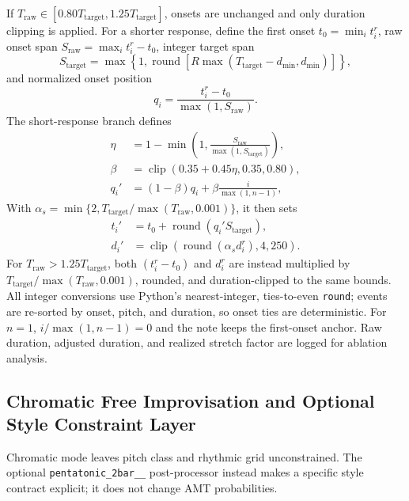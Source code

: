 \documentclass[11pt,a4paper]{article}
\begin{document}
If $T_{\mathrm{raw}}\in[0.80T_{\mathrm{target}},1.25T_{\mathrm{target}}]$, onsets are unchanged and only duration clipping is applied. For a shorter response, define the first onset $t_0=\min_i t_i^r$, raw onset span $S_{\mathrm{raw}}=\max_i t_i^r-t_0$, integer target span
\begin{equation}
S_{\mathrm{target}}=\max\left\{1,\operatorname{round}\left[R\max(T_{\mathrm{target}}-d_{\min},d_{\min})\right]\right\},
\end{equation}
and normalized onset position
\begin{equation}
q_i=\frac{t_i^r-t_0}{\max(1,S_{\mathrm{raw}})}.
\end{equation}
The short-response branch defines
\begin{align}
\eta &= 1-\min\left(1,\frac{S_{\mathrm{raw}}}{\max(1,S_{\mathrm{target}})}\right),\\
\beta &= \operatorname{clip}(0.35+0.45\eta,0.35,0.80),\\
q_i' &= (1-\beta)q_i+\beta\frac{i}{\max(1,n-1)},
\label{eq:actual-onset-time}
\end{align}
With $\alpha_s=\min\{2,T_{\mathrm{target}}/\max(T_{\mathrm{raw}},0.001)\}$, it then sets
\begin{align}
t_i' &= t_0+\operatorname{round}(q_i'S_{\mathrm{target}}),\\
d_i' &= \operatorname{clip}\left(\operatorname{round}(\alpha_s d_i^r),4,250\right).
\label{eq:actual-duration}
\end{align}
For $T_{\mathrm{raw}}>1.25T_{\mathrm{target}}$, both $(t_i^r-t_0)$ and $d_i^r$ are instead multiplied by $T_{\mathrm{target}}/\max(T_{\mathrm{raw}},0.001)$, rounded, and duration-clipped to the same bounds. All integer conversions use Python's nearest-integer, ties-to-even \texttt{round}; events are re-sorted by onset, pitch, and duration, so onset ties are deterministic. For $n=1$, $i/\max(1,n-1)=0$ and the note keeps the first-onset anchor. Raw duration, adjusted duration, and realized stretch factor are logged for ablation analysis.

\subsection{Chromatic Free Improvisation and Optional Style Constraint Layer}

Chromatic mode leaves pitch class and rhythmic grid unconstrained. The optional \texttt{pentatonic\_\allowbreak 2bar\_\_} post-processor instead makes a specific style contract explicit; it does not change AMT probabilities.
\end{document}
